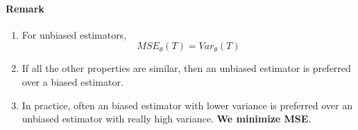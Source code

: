 \documentclass[11pt]{article}
\newcommand{\tb}[1]{\textbf{#1}}
\begin{document}
\paragraph{Remark}
\begin{enumerate}
	\item For unbiased estimators, $$MSE_\theta(T) = Var_\theta(T)$$
	\item If all the other properties are similar, then an unbiased estimator is preferred over a biased estimator.
	\item In practice, often an biased estimator with lower variance is preferred over an unbiased estimator with really high variance. \tb{We minimize MSE}.
\end{enumerate}
\end{document}
